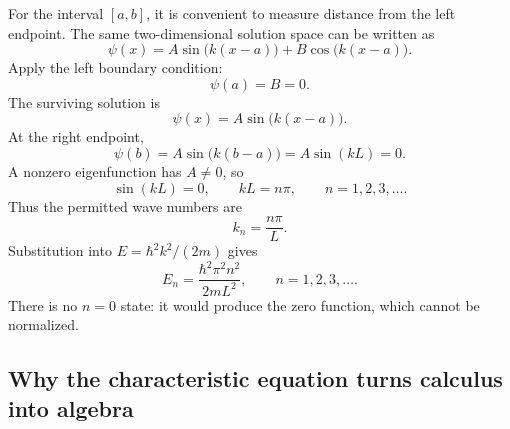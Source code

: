 For the interval \([a,b]\), it is convenient to measure distance from the left
endpoint. The same two-dimensional solution space can be written as
\begin{equation}
  \psi(x)
  =A\sin\!\bigl(k(x-a)\bigr)
   +B\cos\!\bigl(k(x-a)\bigr).
\end{equation}
Apply the left boundary condition:
\begin{equation}
  \psi(a)=B=0.
\end{equation}
The surviving solution is
\begin{equation}
  \psi(x)=A\sin\!\bigl(k(x-a)\bigr).
\end{equation}
At the right endpoint,
\begin{equation}
  \psi(b)=A\sin\!\bigl(k(b-a)\bigr)=A\sin(kL)=0.
\end{equation}
A nonzero eigenfunction has \(A\neq0\), so
\begin{equation}
  \sin(kL)=0,
  \qquad
  kL=n\pi,
  \qquad
  n=1,2,3,\ldots.
\end{equation}
Thus the permitted wave numbers are
\begin{equation}
  k_n=\frac{n\pi}{L}.
\end{equation}
Substitution into \(E=\hbar^2k^2/(2m)\) gives
\begin{equation}
  E_n
  =\frac{\hbar^2\pi^2n^2}{2mL^2},
  \qquad
  n=1,2,3,\ldots.
\end{equation}
There is no \(n=0\) state: it would produce the zero function, which cannot be
normalized.

\subsection{Why the characteristic equation turns calculus into algebra}

